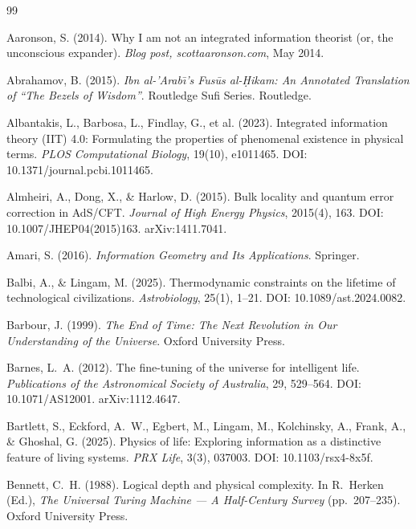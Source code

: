 \documentclass[12pt, a4paper]{article}
\begin{document}
\newpage

\begin{thebibliography}{99}

Aaronson, S. (2014). Why I am not an integrated information theorist (or, the unconscious
expander). \textit{Blog post, scottaaronson.com}, May 2014.

Abrahamov, B. (2015). \textit{Ibn al-'Arab\={\i}'s Fus\={u}s al-\d{H}ikam: An Annotated
Translation of ``The Bezels of Wisdom''}. Routledge Sufi Series. Routledge.

Albantakis, L., Barbosa, L., Findlay, G., et al. (2023). Integrated information theory
(IIT) 4.0: Formulating the properties of phenomenal existence in physical terms.
\textit{PLOS Computational Biology}, 19(10), e1011465.
DOI: 10.1371/journal.pcbi.1011465.

Almheiri, A., Dong, X., \& Harlow, D. (2015). Bulk locality and quantum error correction
in AdS/CFT. \textit{Journal of High Energy Physics}, 2015(4), 163.
DOI: 10.1007/JHEP04(2015)163. arXiv:1411.7041.

Amari, S. (2016). \textit{Information Geometry and Its Applications}. Springer.

Balbi, A., \& Lingam, M. (2025). Thermodynamic constraints on the lifetime of technological
civilizations. \textit{Astrobiology}, 25(1), 1--21.
DOI: 10.1089/ast.2024.0082.

Barbour, J. (1999). \textit{The End of Time: The Next Revolution in Our Understanding of the
Universe}. Oxford University Press.

Barnes, L.~A. (2012). The fine-tuning of the universe for intelligent life.
\textit{Publications of the Astronomical Society of Australia}, 29, 529--564.
DOI: 10.1071/AS12001. arXiv:1112.4647.

Bartlett, S., Eckford, A.~W., Egbert, M., Lingam, M., Kolchinsky, A., Frank, A., \&
Ghoshal, G. (2025). Physics of life: Exploring information as a distinctive feature of
living systems. \textit{PRX Life}, 3(3), 037003.
DOI: 10.1103/rsx4-8x5f.

Bennett, C.~H. (1988). Logical depth and physical complexity. In R.~Herken (Ed.),
\textit{The Universal Turing Machine --- A Half-Century Survey} (pp.~207--235). Oxford
University Press.


\end{thebibliography}
\end{document}

